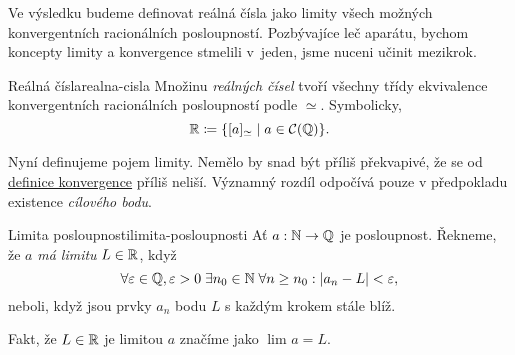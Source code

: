 Ve výsledku budeme definovat reálná čísla jako limity všech možných
konvergentních racionálních posloupností. Pozbývajíce leč aparátu, bychom
koncepty limity a konvergence stmelili v~jeden, jsme nuceni učinit mezikrok.

\begin{definition}{Reálná čísla}{realna-cisla}
 Množinu \emph{reálných čísel} tvoří všechny třídy ekvivalence konvergentních
 racionálních posloupností podle $ \simeq $. Symbolicky,
 \[
  \mathbb{R} \coloneqq \{[a]_{ \simeq } \mid a \in \mathcal{C}(\mathbb{Q})\}.
 \]
\end{definition}

Nyní definujeme pojem limity. Nemělo by snad být příliš překvapivé, že se od
\hyperref[def:konvergentni-posloupnost]{definice konvergence} příliš neliší.
Významný rozdíl odpočívá pouze v předpokladu existence \emph{cílového bodu}.

\begin{definition}{Limita posloupnosti}{limita-posloupnosti}
 Ať $a:\mathbb{N} \to \mathbb{Q}$ je posloupnost. Řekneme, že $a$ \emph{má limitu} $L \in \mathbb{R}$,
 když
 \[
  \forall \varepsilon \in \mathbb{Q},\varepsilon>0 \; \exists n_0 \in \mathbb{N} \; \forall n
  \geq n_0: |a_n - L|<\varepsilon,
 \]
 neboli, když jsou prvky $a_n$ bodu $L$ s každým krokem stále blíž.

 Fakt, že $L \in \mathbb{R}$ je limitou $a$ značíme jako $\lim_{} a = L$.
\end{definition}

